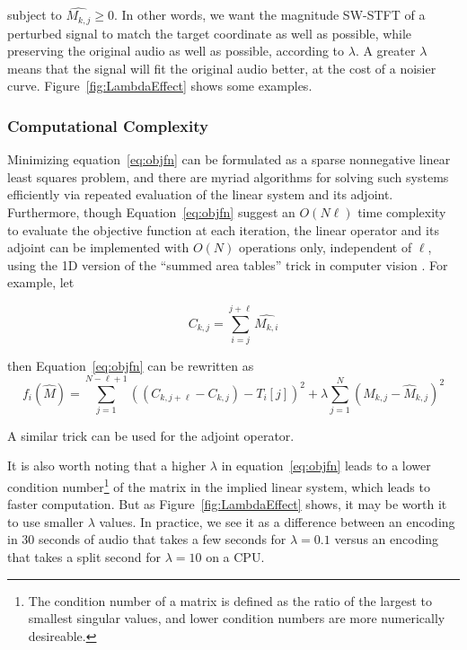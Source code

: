 \documentclass[runningheads]{llncs}
\begin{document}
subject to $\hat{M_{k, j}} \geq 0$.  In other words, we want the magnitude SW-STFT of a perturbed signal to match the target coordinate as well as possible, while preserving the original audio as well as possible, according to $\lambda$.  A greater $\lambda$ means that the signal will fit the original audio better, at the cost of a noisier curve.  Figure~\ref{fig:LambdaEffect} shows some examples.




\subsubsection{Computational Complexity}
\label{sec:computation}
Minimizing equation~\ref{eq:objfn} can be formulated as a sparse nonnegative linear least squares problem, and there are myriad algorithms for solving such systems efficiently via repeated evaluation of the linear system and its adjoint.  Furthermore, though Equation~\ref{eq:objfn} suggest an $O(N \ell)$ time complexity to evaluate the objective function at each iteration, the linear operator and its adjoint can be implemented with $O(N)$ operations only, independent of $\ell$, using the 1D version of the ``summed area tables'' trick in computer vision \cite{lewisfast}.  For example, let 

\begin{equation}
  \label{eq:cumusum}
  C_{k, j} = \sum_{i=j}^{j+\ell} \hat{M_{k, i}}
\end{equation}

then Equation~\ref{eq:objfn} can be rewritten as 
\begin{equation}
  \label{eq:objfncumusum}
  f_i(\hat{M}) = \sum_{j=1}^{N-\ell+1} \left( (C_{k, j+\ell}-C_{k, j}) - T_i[j] \right)^2 + \lambda \sum_{j=1}^N \left( M_{k, j} - \hat{M}_{k, j} \right)^2
\end{equation}

A similar trick can be used for the adjoint operator.


It is also worth noting that a higher $\lambda$ in equation~\ref{eq:objfn} leads to a lower condition number\footnote{The condition number of a matrix is defined as the ratio of the largest to smallest singular values, and lower condition numbers are more numerically desireable.} of the matrix in the implied linear system, which leads to faster computation.  But as Figure~\ref{fig:LambdaEffect} shows, it may be worth it to use smaller $\lambda$ values.  In practice, we see it as a difference between an encoding in 30 seconds of audio that takes a few seconds for $\lambda=0.1$ versus an encoding that takes a split second for $\lambda=10$ on a CPU.
\end{document}
